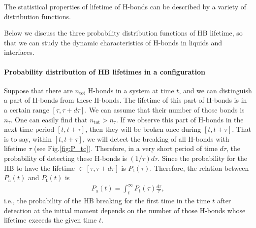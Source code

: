 The statistical properties of lifetime of H-bonds can be described by a variety of distribution functions.{\cite{Rapaport1983, Tanaka1983, Geiger1984,Naberukhin2009}
Below we discuss the three probability distribution functions of HB lifetime, so that we can study the dynamic characteristics of H-bonds in liquids and interfaces.

\paragraph{Probability distribution of HB lifetimes in a configuration}\label{P_tc}
Suppose that there are $n_\text{tot}$ H-bonds in a system at time $t$, and we can distinguish a part of H-bonds from these H-bonds. 
The lifetime of this part of H-bonds is in a certain range $[\tau, \tau + d\tau]$. We can assume that their number of those bonds is $n_\tau$. 
One can easily find that $n_\text{tot}>n_\tau$. If we observe this part of H-bonds in the next time period $[t, t+\tau]$, 
then they will be broken once during $[t, t+\tau]$. 
That is to say, within $[t,t+\tau]$, we will detect the breaking of all H-bonds with lifetime $\tau$ (see Fig.\thinspace\ref{fig:P_tc}).  
Therefore, in a very short period of time $d\tau$, the probability of detecting these H-bonds is $(1/\tau)d\tau$.
Since the probability for the HB to have the lifetime $\in [\tau,\tau+d\tau]$ is $P_\text{t}(\tau)$. 
Therefore, the relation between $P_\text{a}(t)$ and $P_\text{t}(t)$ is
\begin{eqnarray}
P_\text{a}(t) = \int_t^\infty P_\text{t}(\tau)\frac{d\tau}{\tau},
\label{eq:Pt_and_P}
\end{eqnarray}
i.e., the probability of the HB breaking for the first time in the time $t$ after detection at the initial moment depends on 
the number of those H-bonds whose lifetime exceeds the given time $t$. \cite{Voloshin2009}
\begin{figure}
\centering
{}
\end{figure}}
